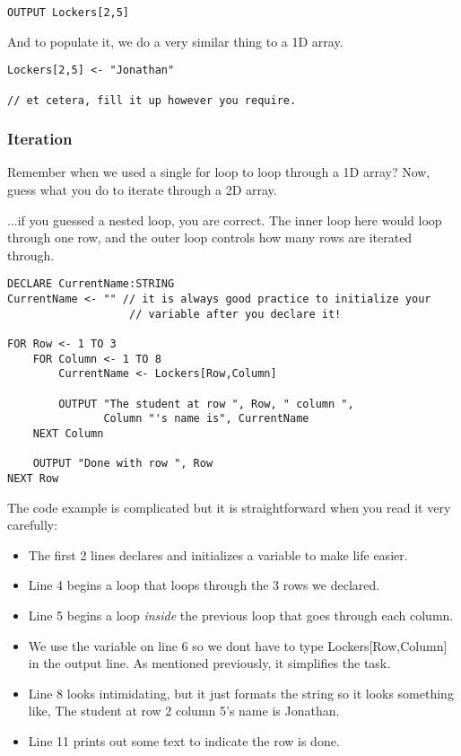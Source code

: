 \documentclass[./main.tex]{subfiles}
\begin{document}
\begin{verbatim}
OUTPUT Lockers[2,5]
\end{verbatim}

And to populate it, we do a very similar thing to a 1D array.

\begin{verbatim}
Lockers[2,5] <- "Jonathan"

// et cetera, fill it up however you require.
\end{verbatim}

\subsubsection{Iteration}

Remember when we used a single for loop to loop through a 1D array? Now, guess what you do to iterate through a 2D array.

...if you guessed a nested loop, you are correct. The inner loop here would loop through one row, and the outer loop controls how many rows are iterated through.

\begin{verbatim}
DECLARE CurrentName:STRING
CurrentName <- "" // it is always good practice to initialize your
                   // variable after you declare it!

FOR Row <- 1 TO 3
    FOR Column <- 1 TO 8
        CurrentName <- Lockers[Row,Column]

        OUTPUT "The student at row ", Row, " column ",
               Column "'s name is", CurrentName
    NEXT Column

    OUTPUT "Done with row ", Row
NEXT Row
\end{verbatim}

The code example is complicated but it is straightforward when you read it very carefully:

\begin{itemize}
    \item The first 2 lines declares and initializes a variable to make life easier.
    \item Line 4 begins a loop that loops through the 3 rows we declared.
    \item Line 5 begins a loop \emph{inside} the previous loop that goes through each column.
    \item We use the variable on line 6 so we dont have to type {\ccmono Lockers[Row,Column]} in the output line. As mentioned previously, it simplifies the task.
    \item Line 8 looks intimidating, but it just formats the string so it looks something like, {\ccmono The student at row 2 column 5's name is Jonathan}.
    \item Line 11 prints out some text to indicate the row is done.
\end{itemize}
\end{document}
